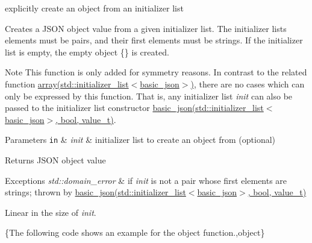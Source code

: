 explicitly create an object from an initializer list 

Creates a J\-S\-O\-N object value from a given initializer list. The initializer lists elements must be pairs, and their first elements must be strings. If the initializer list is empty, the empty object {\ttfamily \{\}} is created.

\begin{DoxyNote}{Note}
This function is only added for symmetry reasons. In contrast to the related function \hyperlink{classnlohmann_1_1basic__json_a5685815624b086caa532f41e853d4b0f}{array(std\-::initializer\-\_\-list$<$basic\-\_\-json$>$)}, there are no cases which can only be expressed by this function. That is, any initializer list {\itshape init} can also be passed to the initializer list constructor \hyperlink{classnlohmann_1_1basic__json_afeb998aec45296bc2050bd1c41ef41eb}{basic\-\_\-json(std\-::initializer\-\_\-list$<$basic\-\_\-json$>$, bool, value\-\_\-t)}.
\end{DoxyNote}

\begin{DoxyParams}[1]{Parameters}
\mbox{\tt in}  & {\em init} & initializer list to create an object from (optional)\\
\hline
\end{DoxyParams}
\begin{DoxyReturn}{Returns}
J\-S\-O\-N object value
\end{DoxyReturn}

\begin{DoxyExceptions}{Exceptions}
{\em std\-::domain\-\_\-error} & if {\itshape init} is not a pair whose first elements are strings; thrown by \hyperlink{classnlohmann_1_1basic__json_afeb998aec45296bc2050bd1c41ef41eb}{basic\-\_\-json(std\-::initializer\-\_\-list$<$basic\-\_\-json$>$, bool, value\-\_\-t)}\\
\hline
\end{DoxyExceptions}
Linear in the size of {\itshape init}.

\{The following code shows an example for the {\ttfamily object} function.,object\}

